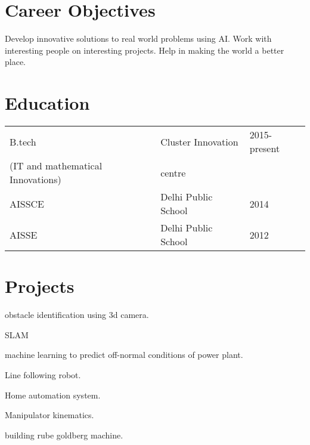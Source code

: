 \documentclass[11pt,a4paper,sans]{moderncv}        %
\begin{document}
\makecvtitle
\section{Career Objectives}
Develop innovative solutions to real world problems using AI.
Work with interesting people on interesting projects.
Help in making the world a better place.
\section{Education}
\begin{tabular}{lll}
B.tech&  Cluster Innovation  &  2015-present \\
(IT and mathematical Innovations)\hspace{0.4cm} & centre & \\
\hline
AISSCE                                   & Delhi Public School\hspace{0.4cm}       & 2014         \\
\hline
AISSE                                    & Delhi Public School       & 2012        
\end{tabular}

\section{Projects}
\begin{enumerate}
{\setlength\itemindent{120pt} \item obstacle identification using 3d camera.}
{\setlength\itemindent{120pt} \item SLAM}
{\setlength\itemindent{120pt} \item machine learning to predict off-normal conditions of power plant.}
{\setlength\itemindent{120pt} \item Line following robot.}
{\setlength\itemindent{120pt} \item Home automation system.}
{\setlength\itemindent{120pt} \item Manipulator kinematics.}
{\setlength\itemindent{120pt} \item building rube goldberg machine.}
\end{enumerate}
\end{document}

